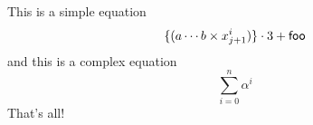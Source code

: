 \documentclass{article}
\begin{document}
This is a simple equation
\begin{displaymath}
\{ ( a \cdots b \times x^i_{j+1} ) \} \cdot 3 + {\sf foo}
\end{displaymath}
and this is a complex equation
\begin{displaymath}
\sum^n_{i=0} \alpha^i
\end{displaymath}
That's all!
\end{document}
